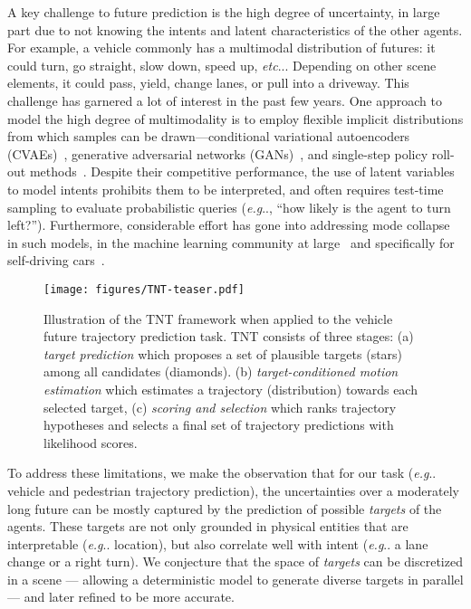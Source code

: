 \documentclass{article}
\makeatletter
\DeclareRobustCommand\onedot{\futurelet\@let@token\@onedot}
\def\@onedot{\ifx\@let@token.\else.\null\fi\xspace}
\newcommand{\model}{TNT\xspace}
\def\eg{\emph{e.g}\onedot} \def\Eg{\emph{E.g}\onedot}
\def\etc{\emph{etc}\onedot} \def\vs{\emph{vs}\onedot}
\makeatother
\begin{document}
A key challenge to future prediction is the high degree of uncertainty, in large part due to not knowing the intents and latent characteristics of the other agents. For example, a vehicle commonly has a multimodal distribution of futures: it could turn, go straight, slow down, speed up, \etc. Depending on other scene elements, it could pass, yield, change lanes, or pull into a driveway.
This challenge has garnered a lot of interest in the past few years.  One approach to model the high degree of multimodality is to employ flexible implicit distributions from which samples can be drawn---conditional variational autoencoders (CVAEs)~\cite{DESIRE}, generative adversarial networks (GANs)~\cite{SocialGAN}, and single-step policy roll-out methods~\cite{precog_Rhinehart_2019_ICCV}.
Despite their competitive performance, the use of latent variables to model intents prohibits them to be interpreted, and often requires test-time sampling to evaluate probabilistic queries (\eg, ``how likely is the agent to turn left?'').
Furthermore, considerable effort has gone into addressing mode collapse in such models, in the machine learning community at large~\cite{salimans2016improvedGANS} and specifically for self-driving cars~\cite{rhinehart2018r2p2,kitani_diverse_forecasting_dpps}.

\begin{figure}[h]
    \centering
    \texttt{[image: figures/TNT-teaser.pdf]}
    \caption{Illustration of the \model framework when applied to the vehicle future trajectory prediction task. \model consists of three stages: (a) {\em target prediction} which proposes a set of plausible targets (stars) among all candidates (diamonds). (b) {\em target-conditioned motion estimation} which estimates a trajectory (distribution) towards each selected target, (c) {\em  scoring and selection} which ranks trajectory hypotheses and selects a final set of trajectory predictions with likelihood scores.}
    \label{fig:teaser}
\end{figure}

To address these limitations, we make the observation that for our task (\eg vehicle and pedestrian trajectory prediction), the uncertainties over a moderately long future can be mostly captured by the prediction of possible \textit{targets} of the agents. These targets are not only grounded in physical entities that are interpretable (\eg location), but also correlate well with intent (\eg a lane change or a right turn). We conjecture that the space of \textit{targets} can be discretized in a scene --- allowing a deterministic model to generate diverse targets in parallel --- and later refined to be more accurate.
\end{document}
